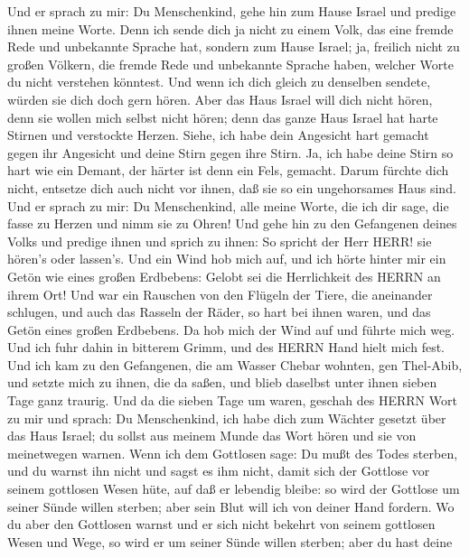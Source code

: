  Und er sprach zu mir: Du Menschenkind, gehe hin zum Hause
Israel und predige ihnen meine Worte.  Denn ich sende dich
ja nicht zu einem Volk, das eine fremde Rede und unbekannte Sprache hat,
sondern zum Hause Israel;  ja, freilich nicht zu großen
Völkern, die fremde Rede und unbekannte Sprache haben, welcher Worte du
nicht verstehen könntest. Und wenn ich dich gleich zu denselben sendete,
würden sie dich doch gern hören.  Aber das Haus Israel will
dich nicht hören, denn sie wollen mich selbst nicht hören; denn das
ganze Haus Israel hat harte Stirnen und verstockte Herzen. 
Siehe, ich habe dein Angesicht hart gemacht gegen ihr Angesicht und
deine Stirn gegen ihre Stirn.  Ja, ich habe deine Stirn so
hart wie ein Demant, der härter ist denn ein Fels, gemacht. Darum
fürchte dich nicht, entsetze dich auch nicht vor ihnen, daß sie so ein
ungehorsames Haus sind.  Und er sprach zu mir: Du
Menschenkind, alle meine Worte, die ich dir sage, die fasse zu Herzen
und nimm sie zu Ohren!  Und gehe hin zu den Gefangenen
deines Volks und predige ihnen und sprich zu ihnen: So spricht der Herr
HERR! sie hören's oder lassen's.  Und ein Wind hob mich
auf, und ich hörte hinter mir ein Getön wie eines großen Erdbebens:
Gelobt sei die Herrlichkeit des HERRN an ihrem Ort!  Und
war ein Rauschen von den Flügeln der Tiere, die aneinander schlugen, und
auch das Rasseln der Räder, so hart bei ihnen waren, und das Getön eines
großen Erdbebens.  Da hob mich der Wind auf und führte mich
weg. Und ich fuhr dahin in bitterem Grimm, und des HERRN Hand hielt mich
fest.  Und ich kam zu den Gefangenen, die am Wasser Chebar
wohnten, gen Thel-Abib, und setzte mich zu ihnen, die da saßen, und
blieb daselbst unter ihnen sieben Tage ganz traurig.  Und
da die sieben Tage um waren, geschah des HERRN Wort zu mir und sprach:
 Du Menschenkind, ich habe dich zum Wächter gesetzt über
das Haus Israel; du sollst aus meinem Munde das Wort hören und sie von
meinetwegen warnen.  Wenn ich dem Gottlosen sage: Du mußt
des Todes sterben, und du warnst ihn nicht und sagst es ihm nicht, damit
sich der Gottlose vor seinem gottlosen Wesen hüte, auf daß er lebendig
bleibe: so wird der Gottlose um seiner Sünde willen sterben; aber sein
Blut will ich von deiner Hand fordern.  Wo du aber den
Gottlosen warnst und er sich nicht bekehrt von seinem gottlosen Wesen
und Wege, so wird er um seiner Sünde willen sterben; aber du hast deine
